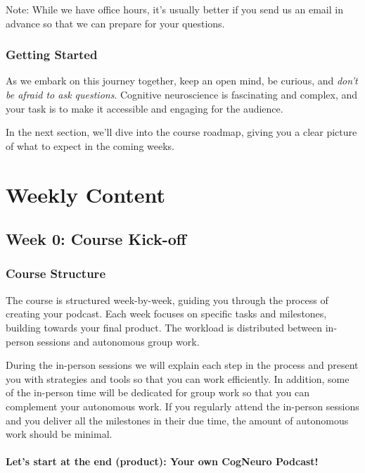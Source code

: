 \documentclass[
  letterpaper,
  DIV=11,
  numbers=noendperiod]{scrreprt}
\begin{document}
Note: While we have office hours, it's usually better if you send us an
email in advance so that we can prepare for your questions.

\section{Getting Started}\label{getting-started}

As we embark on this journey together, keep an open mind, be curious,
and \emph{don't be afraid to ask questions}. Cognitive neuroscience is
fascinating and complex, and your task is to make it accessible and
engaging for the audience.

In the next section, we'll dive into the course roadmap, giving you a
clear picture of what to expect in the coming weeks.

\part{Weekly Content}

\chapter{Week 0: Course Kick-off}\label{week-0-course-kick-off}

\section{Course Structure}\label{course-structure}

The course is structured week-by-week, guiding you through the process
of creating your podcast. Each week focuses on specific tasks and
milestones, building towards your final product. The workload is
distributed between in-person sessions and autonomous group work.

During the in-person sessions we will explain each step in the process
and present you with strategies and tools so that you can work
efficiently. In addition, some of the in-person time will be dedicated
for group work so that you can complement your autonomous work. If you
regularly attend the in-person sessions and you deliver all the
milestones in their due time, the amount of autonomous work should be
minimal.

\subsection{Let's start at the end (product): Your own CogNeuro
Podcast!}\label{lets-start-at-the-end-product-your-own-cogneuro-podcast}
\end{document}
